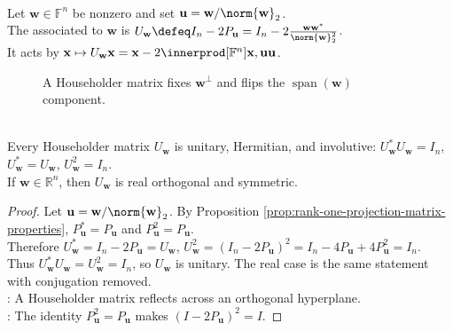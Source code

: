 \begin{definition} \label{def:householder-matrix} \\
Let $\mathbf{w}\in\mathbb{F}^n$ be nonzero and set $\mathbf{u}=\mathbf{w}/\norm{\mathbf{w}}_2$.\\
The  associated to $\mathbf{w}$ is $U_{\mathbf{w}}\defeq I_n-2P_{\mathbf{u}}=I_n-2\frac{\mathbf{w}\mathbf{w}^*}{\norm{\mathbf{w}}_2^2}$.\\
It acts by $\mathbf{x}\mapsto U_{\mathbf{w}}\mathbf{x}=\mathbf{x}-2\innerprod[\mathbb{F}^n]{\mathbf{x},\mathbf{u}}\mathbf{u}$.
\end{definition}

\begin{figure}[H]
  \centering
  
  \caption{A Householder matrix fixes $\mathbf{w}^{\perp}$ and flips the $\operatorname{span}(\mathbf{w})$ component.}
  \label{fig:householder-reflection}
\end{figure}

\begin{theorem} \label{thm:householder-matrix-properties} \\
Every Householder matrix $U_{\mathbf{w}}$ is unitary, Hermitian, and involutive: $U_{\mathbf{w}}^*U_{\mathbf{w}}=I_n$, $U_{\mathbf{w}}^*=U_{\mathbf{w}}$, $U_{\mathbf{w}}^2=I_n$.\\
If $\mathbf{w}\in\mathbb{R}^n$, then $U_{\mathbf{w}}$ is real orthogonal and symmetric.
\begin{proof}
Let $\mathbf{u}=\mathbf{w}/\norm{\mathbf{w}}_2$. By Proposition \ref{prop:rank-one-projection-matrix-properties}, $P_{\mathbf{u}}^*=P_{\mathbf{u}}$ and $P_{\mathbf{u}}^2=P_{\mathbf{u}}$.\\
Therefore $U_{\mathbf{w}}^*=I_n-2P_{\mathbf{u}}=U_{\mathbf{w}}$, $U_{\mathbf{w}}^2=(I_n-2P_{\mathbf{u}})^2=I_n-4P_{\mathbf{u}}+4P_{\mathbf{u}}^2=I_n$.\\
Thus $U_{\mathbf{w}}^*U_{\mathbf{w}}=U_{\mathbf{w}}^2=I_n$, so $U_{\mathbf{w}}$ is unitary. The real case is the same statement with conjugation removed.\\
: A Householder matrix reflects across an orthogonal hyperplane.\\
: The identity $P_{\mathbf{u}}^2=P_{\mathbf{u}}$ makes $(I-2P_{\mathbf{u}})^2=I$.
\end{proof}
\end{theorem}

